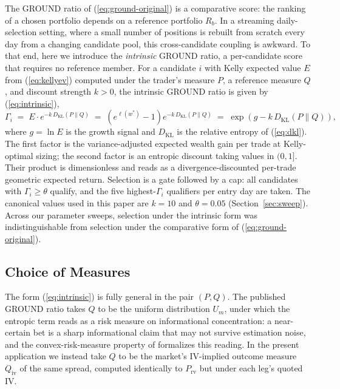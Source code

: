 \documentclass[11pt]{article}
\newcommand{\dkl}{D_{\mathrm{KL}}}
\begin{document}
The GROUND ratio of (\ref{eq:ground-original}) is a comparative score: the
ranking of a chosen portfolio depends on a reference portfolio $R_b$. In a
streaming daily-selection setting, where a small number of positions is
rebuilt from scratch every day from a changing candidate pool, this
cross-candidate coupling is awkward. To that end, here we introduce the
\emph{intrinsic} GROUND ratio, a per-candidate score that requires no
reference member. For a candidate $i$ with Kelly expected value $E$ from
(\ref{eq:kellyev}) computed under the trader's measure $P$, a reference
measure $Q$, and discount strength $k > 0$, the intrinsic GROUND ratio is
given by (\ref{eq:intrinsic}),
\begin{equation}
\Gamma_i \;=\; E \cdot e^{-k\,\dkl(P \| Q)}
\;=\; \left(e^{\ell(w^\ast)} - 1\right) e^{-k\,\dkl(P \| Q)}
\;=\; \exp\!\left(g - k\,\dkl(P \| Q)\right),
\label{eq:intrinsic}
\end{equation}
where $g = \ln E$ is the growth signal and $\dkl$ is the relative entropy of
(\ref{eq:dkl}). The first factor is the variance-adjusted expected wealth
gain per trade at Kelly-optimal sizing; the second factor is an entropic
discount taking values in $(0, 1]$. Their product is dimensionless and reads
as a divergence-discounted per-trade geometric expected return. Selection is
a gate followed by a cap: all candidates with $\Gamma_i \geq \theta$ qualify,
and the five highest-$\Gamma_i$ qualifiers per entry day are taken. The
canonical values used in this paper are $k = 10$ and $\theta = 0.05$
(Section~\ref{sec:sweep}). Across our parameter sweeps, selection under the
intrinsic form was indistinguishable from selection under the comparative
form of (\ref{eq:ground-original}).

\subsection{Choice of Measures}
\label{sec:measures}

The form (\ref{eq:intrinsic}) is fully general in the pair $(P, Q)$. The
published GROUND ratio takes $Q$ to be the uniform distribution $U_m$, under
which the entropic term reads as a risk measure on informational
concentration: a near-certain bet is a sharp informational claim that may not
survive estimation noise, and the convex-risk-measure property of
\cite{mercurio2020binary} formalizes this reading. In the present application
we instead take $Q$ to be the market's IV-implied outcome measure
$Q_{\mathrm{iv}}$ of the same spread, computed identically to
$P_{\mathrm{rv}}$ but under each leg's quoted IV.
\end{document}
